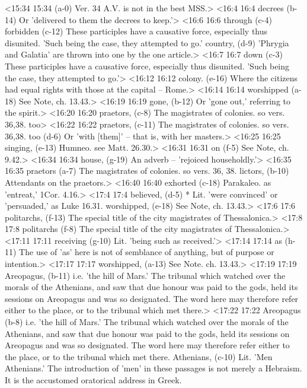 <15:34 15:34   (a-0)  Ver. 34 A.V. is not in the best MSS.>
<16:4 16:4  decrees (b-14)  Or 'delivered to them the decrees to keep.'>
<16:6 16:6  through (c-4) forbidden (c-12)
 These participles have a causative force, especially thus disunited. 'Such being the case, they attempted to go.'
  country, (d-9)  'Phrygia and Galatia' are thrown into one by the one article.>
<16:7 16:7  down (c-3)  These participles have a causative force, especially thus  disunited. 'Such being the case, they attempted to go.'>
<16:12 16:12  colony. (e-16)  Where the citizens had equal rights with those at the capital  -- Rome.>
<16:14 16:14  worshipped (a-18)  See Note, ch. 13.43.>
<16:19 16:19  gone, (b-12)  Or 'gone out,' referring to the spirit.>
<16:20 16:20  praetors, (c-8) The magistrates of colonies. so vers. 36,38. too>
<16:22 16:22  praetors, (c-11)  The magistrates of colonies. so vers. 36,38.
  too (d-6)  Or 'with [them]' -- that is, with her masters.>
<16:25 16:25  singing, (e-13)  Humneo. see Matt. 26.30.>
<16:31 16:31  on (f-5)  See Note, ch. 9.42.>
<16:34 16:34  house, (g-19)  An adverb -- 'rejoiced householdly.'>
<16:35 16:35  praetors (a-7)  The magistrates of colonies. so vers. 36, 38.
  lictors, (b-10)  Attendants on the praetors.>
<16:40 16:40  exhorted (c-18)  Parakaleo. as 'entreat,' 1Cor. 4.16.>
<17:4 17:4  believed, (d-5)  * Lit. 'were convinced' or 'persuaded,' as Luke 16.31.
  worshipped, (e-18)  See Note, ch. 13.43.>
<17:6 17:6  politarchs, (f-13) The special title of the city magistrates of Thessalonica.>
<17:8 17:8  politarchs (f-8)  The special title of the city magistrates of Thessalonica.>
<17:11 17:11  receiving (g-10)  Lit. 'being such as received.'>
<17:14 17:14  as (h-11)  The use of 'as' here is not of semblance of anything, but of  purpose or intention.>
<17:17 17:17  worshipped, (a-13)  See Note. ch. 13.43.>
<17:19 17:19  Areopagus, (b-11)  i.e. 'the hill of Mars.' The tribunal which watched over the  morals of the Athenians, and saw that due honour was paid to  the gods, held its sessions on Areopagus and was so designated.  The word here may therefore refer either to the place, or to  the tribunal which met there.>
<17:22 17:22  Areopagus (b-8)  i.e. 'the hill of Mars.' The tribunal which watched over the  morals of the Athenians, and saw that due honour was paid to  the gods, held its sessions on Areopagus and was so designated.  The word here may therefore refer either to the place, or to  the tribunal which met there.
  Athenians, (c-10)  Lit. 'Men Athenians.' The introduction of 'men' in these  passages is not merely a Hebraism. It is the accustomed  oratorical address in Greek.

